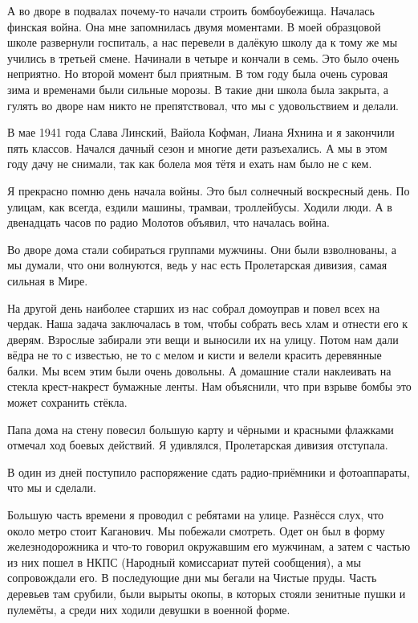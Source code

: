 А во дворе в подвалах почему-то начали строить бомбоубежища. Началась финская война. Она мне запомнилась двумя моментами. В моей образцовой школе развернули госпиталь, а нас перевели в далёкую школу да к тому же мы учились в третьей смене. Начинали в четыре и кончали в семь. Это было очень неприятно. Но второй момент был приятным. В том году была очень суровая зима и временами были сильные морозы. В такие дни школа была закрыта, а гулять во дворе нам никто не препятствовал, что мы с удовольствием и делали.

В мае 1941 года Слава Линский, Вайола Кофман, Лиана Яхнина и я закончили пять классов. Начался дачный сезон и многие дети разъехались. А мы в этом году дачу не снимали, так как болела моя тётя и ехать нам было не с кем.

Я прекрасно помню день начала войны. Это был солнечный воскресный день. По улицам, как всегда, ездили машины, трамваи, троллейбусы. Ходили люди. А в двенадцать часов по радио Молотов объявил, что началась война.

Во дворе дома стали собираться группами мужчины. Они были взволнованы, а мы думали, что они волнуются, ведь у нас есть Пролетарская дивизия, самая сильная в Мире.

На другой день наиболее старших из нас собрал домоуправ и повел всех на чердак. Наша задача заключалась в том, чтобы собрать весь хлам и отнести его к дверям. Взрослые забирали эти вещи и выносили их на улицу. Потом нам дали вёдра не то с известью, не то с мелом и кисти и велели красить деревянные балки. Мы всем этим были очень довольны. А домашние стали наклеивать на стекла крест-накрест бумажные ленты. Нам объяснили, что при взрыве бомбы это может сохранить стёкла.

Папа дома на стену повесил большую карту и чёрными и красными флажками отмечал ход боевых действий. Я удивлялся, Пролетарская дивизия отступала.

В один из дней поступило распоряжение сдать радио-приёмники и фотоаппараты, что мы и сделали.

Большую часть времени я проводил с ребятами на улице. Разнёсся слух, что около метро стоит Каганович. Мы побежали смотреть. Одет он был в форму железнодорожника и что-то говорил окружавшим его мужчинам, а затем с частью из них пошел в НКПС (Народный комиссариат путей сообщения), а мы сопровождали его. В последующие дни мы бегали на Чистые пруды. Часть деревьев там срубили, были вырыты окопы, в которых стояли зенитные пушки и пулемёты, а среди них ходили девушки в военной форме.

